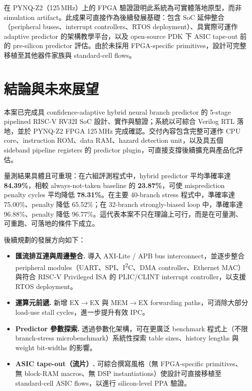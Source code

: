 \documentclass[12pt,a4paper]{article}
\begin{document}
	在 PYNQ-Z2（125\,MHz）上的 FPGA 驗證證明此系統為可實體落地原型，而非 simulation artifact。此成果可直接作為後續發展基礎：包含 SoC 延伸整合（peripheral buses、interrupt controllers、RTOS deployment）、具實際可運作 adaptive predictor 的架構教學平台，以及 open-source PDK 下 ASIC tape-out 前的 pre-silicon predictor 評估。由於未採用 FPGA-specific primitives，設計可完整移植至其他器件家族與 standard-cell flows。

	\section{結論與未來展望}
	\label{sec:conclusion}

	本案已完成具 confidence-adaptive hybrid neural branch predictor 的 5-stage pipelined RISC-V RV32I SoC 設計、實作與驗證；系統以可綜合 Verilog RTL 落地，並於 PYNQ-Z2 FPGA 125\,MHz 完成確認。交付內容包含完整可運作 CPU core、instruction ROM、data RAM、hazard detection unit，以及具五個 sideband pipeline registers 的 predictor plugin，可直接支撐後續擴充與產品化評估。

	量測結果具體且可重現：在六組評測程式中，hybrid predictor 平均準確率達 \textbf{84.39\%}，相較 always-not-taken baseline 的 \textbf{23.87\%}，可使 misprediction penalty cycles 平均降低 \textbf{78.31\%}。在主要 40-branch stress 程式中，準確率達 75.00\%、penalty 降低 65.52\%；在 32-branch strongly-biased loop 中，準確率達 96.88\%、penalty 降低 96.77\%。這代表本案不只在理論上可行，而是在可量測、可重跑、可落地的條件下成立。

	後續規劃的發展方向如下：

	\begin{itemize}
		\item \textbf{匯流排互連與周邊整合.}
		      導入 AXI-Lite / APB bus interconnect，並逐步整合 peripheral modules（UART、SPI、I\textsuperscript{2}C、DMA controller、Ethernet MAC）與符合 RISC-V Privileged ISA 的 PLIC/CLINT interrupt controller，以支援 RTOS deployment。

		\item \textbf{運算元前遞.}
		      新增 EX$\rightarrow$EX 與 MEM$\rightarrow$EX forwarding paths，可消除大部分 load-use stall cycles，進一步提升有效 IPC。

		\item \textbf{Predictor 參數探索.}
		      透過參數化架構，可在更廣泛 benchmark 程式上（不限 branch-stress microbenchmark）系統性探索 table sizes、history lengths 與 weight bit-widths 的影響。

		\item \textbf{ASIC tape-out（流片）.}
		      可綜合撰寫風格（無 FPGA-specific primitives、無 block-RAM macros、無 DSP instantiations）使設計可直接移植至 standard-cell ASIC flows，以進行 silicon-level PPA 驗證。
	\end{itemize}
\end{document}
